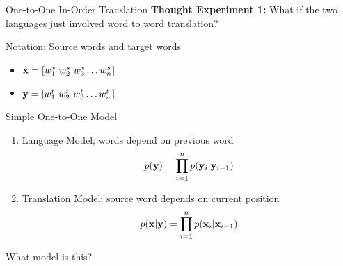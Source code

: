 \documentclass{beamer}
\begin{document}
\begin{frame}{One-to-One In-Order Translation}
  \textbf{Thought Experiment 1:}
  What if the two languages just involved word to word 
  translation?

  \begin{center}
  \end{center}
  
  Notation: Source words and target words
  \begin{itemize}
  \item $\mathbf{x}  = [ w^s_1\ w^s_2\ w^s_3\ldots w^s_n $] 
  \item $\mathbf{y} =  [w^t_1\ w^t_2\ w^t_3\ldots w^t_n $] 
  \end{itemize}
\end{frame}


\begin{frame}{Simple One-to-One Model}
  \begin{enumerate}
  \item Language Model; words depend on previous word
    \[ p(\mathbf{y}) = \prod_{i=1}^n p(\mathbf{y}_i | \mathbf{y}_{i-1})  \] 
    \air 

  \item Translation Model; source word depends on current position
    \[ p(\mathbf{x} | \mathbf{y}) = \prod_{i=1}^n p(\mathbf{x}_i | \mathbf{x}_{i-1})  \] 
  \end{enumerate}

  What model is this?
\end{frame}
\end{document}
